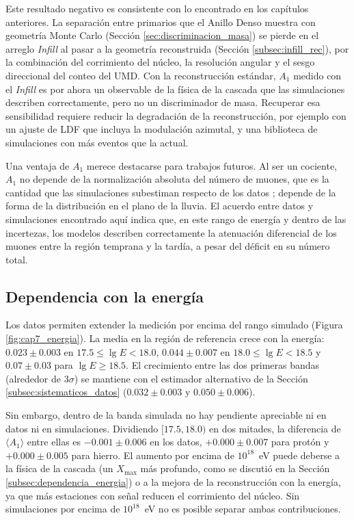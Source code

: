 Este resultado negativo es consistente con lo encontrado en los capítulos anteriores. La separación entre primarios que el Anillo Denso muestra con geometría Monte Carlo (Sección \ref{sec:discriminacion_masa}) se pierde en el arreglo \textit{Infill} al pasar a la geometría reconstruida (Sección \ref{subsec:infill_rec}), por la combinación del corrimiento del núcleo, la resolución angular y el sesgo direccional del conteo del UMD. Con la reconstrucción estándar, $A_1$ medido con el \textit{Infill} es por ahora un observable de la física de la cascada que las simulaciones describen correctamente, pero no un discriminador de masa. Recuperar esa sensibilidad requiere reducir la degradación de la reconstrucción, por ejemplo con un ajuste de LDF que incluya la modulación azimutal, y una biblioteca de simulaciones con más eventos que la actual.

Una ventaja de $A_1$ merece destacarse para trabajos futuros. Al ser un cociente, $A_1$ no depende de la normalización absoluta del número de muones, que es la cantidad que las simulaciones subestiman respecto de los datos \cite{auger2016muon_deficit}; depende de la forma de la distribución en el plano de la lluvia. El acuerdo entre datos y simulaciones encontrado aquí indica que, en este rango de energía y dentro de las incertezas, los modelos describen correctamente la atenuación diferencial de los muones entre la región temprana y la tardía, a pesar del déficit en su número total.

\subsection{Dependencia con la energía}
\label{subsec:energia_datos}

Los datos permiten extender la medición por encima del rango simulado (Figura \ref{fig:cap7_energia}). La media en la región de referencia crece con la energía: $0.023 \pm 0.003$ en $17.5 \leq \lg E < 18.0$, $0.044 \pm 0.007$ en $18.0 \leq \lg E < 18.5$ y $0.07 \pm 0.03$ para $\lg E \geq 18.5$. El crecimiento entre las dos primeras bandas (alrededor de $3\sigma$) se mantiene con el estimador alternativo de la Sección \ref{subsec:sistematicos_datos} ($0.032 \pm 0.003$ y $0.050 \pm 0.006$).

Sin embargo, dentro de la banda simulada no hay pendiente apreciable ni en datos ni en simulaciones. Dividiendo $[17.5, 18.0)$ en dos mitades, la diferencia de $\langle A_1 \rangle$ entre ellas es $-0.001 \pm 0.006$ en los datos, $+0.000 \pm 0.007$ para protón y $+0.000 \pm 0.005$ para hierro. El aumento por encima de $10^{18}$~eV puede deberse a la física de la cascada (un $X_\mathrm{max}$ más profundo, como se discutió en la Sección \ref{subsec:dependencia_energia}) o a la mejora de la reconstrucción con la energía, ya que más estaciones con señal reducen el corrimiento del núcleo. Sin simulaciones por encima de $10^{18}$~eV no es posible separar ambas contribuciones.

